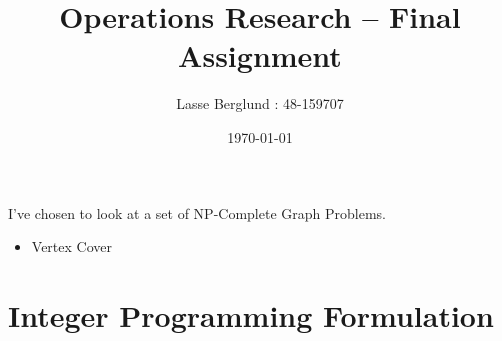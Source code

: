 \documentclass[12pt]{report}
\title{Operations Research -- Final Assignment}
\author{Lasse Berglund : 48-159707}
\date{\today}
\begin{document}
\maketitle

I've chosen to look at a set of NP-Complete Graph Problems.

\begin{itemize}
\item Vertex Cover
\end{itemize}


\section*{Integer Programming Formulation}
\end{document}
